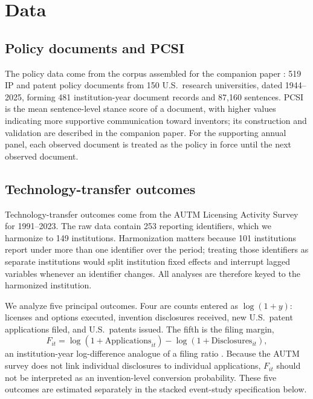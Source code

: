 \section{Data}\label{sec:data}

\subsection{Policy documents and PCSI}

The policy data come from the corpus assembled for the companion paper \citep{SharmaPCSI2026}: 519 IP and patent policy documents from 150 U.S.\ research universities, dated 1944--2025, forming 481 institution-year document records and 87,160 sentences. PCSI is the mean sentence-level stance score of a document, with higher values indicating more supportive communication toward inventors; its construction and validation are described in the companion paper. For the supporting annual panel, each observed document is treated as the policy in force until the next observed document.

\subsection{Technology-transfer outcomes}

Technology-transfer outcomes come from the AUTM Licensing Activity Survey for 1991--2023. The raw data contain 253 reporting identifiers, which we harmonize to 149 institutions. Harmonization matters because 101 institutions report under more than one identifier over the period; treating those identifiers as separate institutions would split institution fixed effects and interrupt lagged variables whenever an identifier changes. All analyses are therefore keyed to the harmonized institution.

We analyze five principal outcomes. Four are counts entered as $\log(1+y)$: licenses and options executed, invention disclosures received, new U.S.\ patent applications filed, and U.S.\ patents issued. The fifth is the filing margin,
\begin{equation}
F_{it}=\log(1+\text{Applications}_{it})-\log(1+\text{Disclosures}_{it}),
\label{eq:filingmargin}
\end{equation}
an institution-year log-difference analogue of a filing ratio \citep{ChoudhryPonzio2020}. Because the AUTM survey does not link individual disclosures to individual applications, $F_{it}$ should not be interpreted as an invention-level conversion probability. These five outcomes are estimated separately in the stacked event-study specification below.

